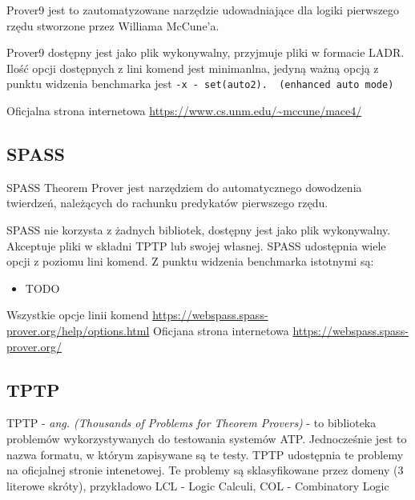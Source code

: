\documentclass[a4paper,12pt]{article}
\begin{document}
Prover9 jest to zautomatyzowane narzędzie udowadniające dla logiki pierwszego rzędu stworzone przez Williama McCune’a.

Prover9 dostępny jest jako plik wykonywalny, przyjmuje pliki w formacie \gls{LADR}. Ilość opcji dostępnych z lini komend jest minimanlna, jedyną ważną opcją z punktu widzenia benchmarka jest
\lstinline{-x - set(auto2).  (enhanced auto mode)}

Oficjalna strona internetowa \url{https://www.cs.unm.edu/~mccune/mace4/}




\subsection{SPASS}

SPASS Theorem Prover jest narzędziem do automatycznego dowodzenia twierdzeń, należących do rachunku predykatów pierwszego rzędu.

SPASS nie korzysta z żadnych bibliotek, dostępny jest jako plik wykonywalny. Akceptuje pliki w składni TPTP lub swojej własnej. SPASS udostępnia wiele opcji z poziomu lini komend. Z punktu widzenia benchmarka istotnymi są:

\begin{itemize}
  \item TODO
\end{itemize}

\noindent
Wszystkie opcje linii komend \url{https://webspass.spass-prover.org/help/options.html}
\noindent \newline
Oficjana strona internetowa \url{https://webspass.spass-prover.org/}




\subsection{TPTP}

TPTP - \textit{ ang. (Thousands of Problems for Theorem Provers)} - to biblioteka problemów wykorzystywanych do testowania systemów ATP. Jednocześnie jest to nazwa formatu, w którym zapisywane są te testy. TPTP udostępnia te problemy na oficjalnej stronie intenetowej.
Te problemy są sklasyfikowane przez domeny (3 literowe skróty), przykładowo
LCL - Logic Calculi,
COL - Combinatory Logic
\end{document}
